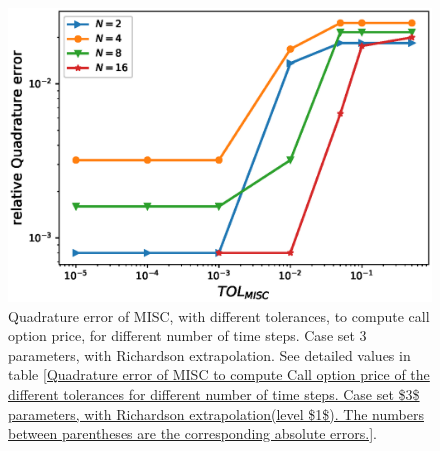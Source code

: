 \begin{figure}[h!]
	\centering
	\includegraphics[width=0.4\linewidth]{./figures/rBergomi_MISC_quadratre_error/vs_TOL/set5/relative_quad_error_wrt_MISC_TOL_set5_with_rich}
	
	
	\caption{Quadrature error of MISC, with  different tolerances,  to compute call option price, for different number of time steps. Case  set $3$ parameters, with Richardson extrapolation.  See detailed values  in table \ref{Quadrature error of MISC to compute Call option price of the different tolerances for different number of time steps. Case set $3$ parameters, with Richardson extrapolation(level $1$). The numbers between parentheses are the corresponding absolute errors.}.}
	\label{fig:Quadrature_error_set3_rich}
\end{figure}
\FloatBarrier
